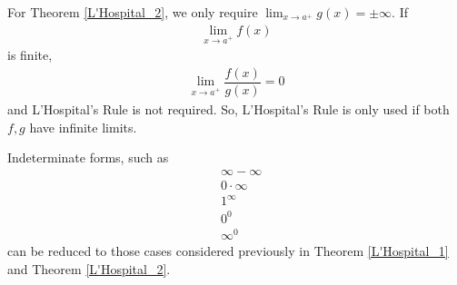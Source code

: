 \begin{note}
For Theorem \ref{L'Hospital_2}, we only require $\lim_{x \longrightarrow a^{+}} g(x) = \pm \infty$. If 
\begin{align*}
    \lim_{x \longrightarrow a^{+}} f(x)
\end{align*} 
is finite,
\begin{align*}
    \lim_{x \longrightarrow a^{+}} \dfrac{f(x)}{g(x)} = 0
\end{align*}
and L'Hospital's Rule is not required. So, L'Hospital's Rule is only used if both $f, g$ have infinite limits.
\end{note}

\begin{note}
Indeterminate forms, such as
\begin{align*}
    &\infty - \infty\\
    &0 \cdot \infty\\
    &1^{\infty}\\
    &0^{0}\\
    &\infty^{0}
\end{align*}
can be reduced to those cases considered previously in Theorem \ref{L'Hospital_1} and Theorem \ref{L'Hospital_2}.
\end{note}
